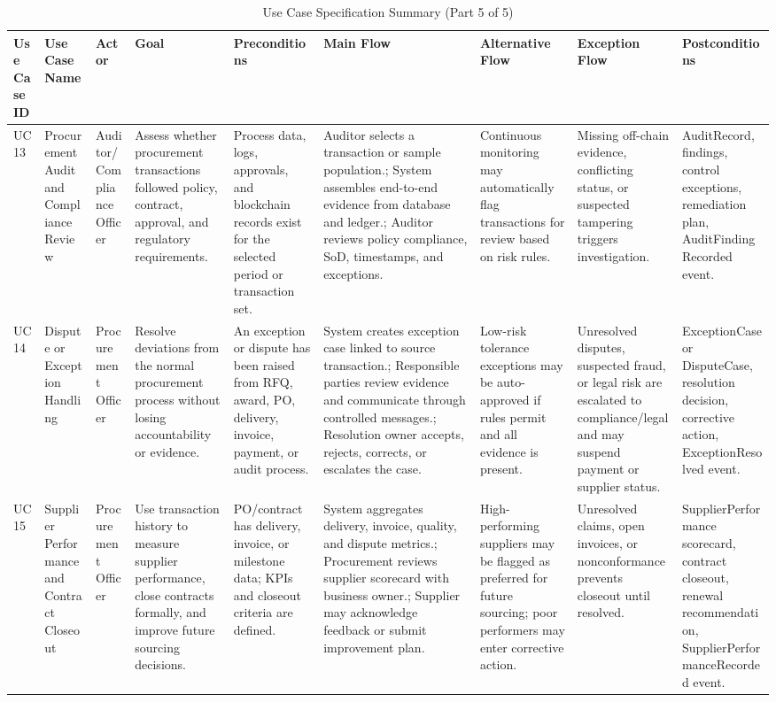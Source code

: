\documentclass[conference]{IEEEtran}
\begin{document}
\begin{table}[!t]
\caption{Use Case Specification Summary (Part 5 of 5)}
\label{tab:usecases-5}
\tiny
\begin{tabularx}{\textwidth}{|L{0.75cm}|L{1.8cm}|L{1.6cm}|Y|Y|Y|Y|Y|Y|}
\hline
\textbf{Use Case ID} & \textbf{Use Case Name} & \textbf{Actor} & \textbf{Goal} & \textbf{Preconditions} & \textbf{Main Flow} & \textbf{Alternative Flow} & \textbf{Exception Flow} & \textbf{Postconditions} \\ \hline
UC13 & Procurement Audit and Compliance Review & Auditor/Compliance Officer & Assess whether procurement transactions followed policy, contract, approval, and regulatory requirements. & Process data, logs, approvals, and blockchain records exist for the selected period or transaction set. & Auditor selects a transaction or sample population.; System assembles end-to-end evidence from database and ledger.; Auditor reviews policy compliance, SoD, timestamps, and exceptions. & Continuous monitoring may automatically flag transactions for review based on risk rules. & Missing off-chain evidence, conflicting status, or suspected tampering triggers investigation. & AuditRecord, findings, control exceptions, remediation plan, AuditFindingRecorded event. \\ \hline
UC14 & Dispute or Exception Handling & Procurement Officer & Resolve deviations from the normal procurement process without losing accountability or evidence. & An exception or dispute has been raised from RFQ, award, PO, delivery, invoice, payment, or audit process. & System creates exception case linked to source transaction.; Responsible parties review evidence and communicate through controlled messages.; Resolution owner accepts, rejects, corrects, or escalates the case. & Low-risk tolerance exceptions may be auto-approved if rules permit and all evidence is present. & Unresolved disputes, suspected fraud, or legal risk are escalated to compliance/legal and may suspend payment or supplier status. & ExceptionCase or DisputeCase, resolution decision, corrective action, ExceptionResolved event. \\ \hline
UC15 & Supplier Performance and Contract Closeout & Procurement Officer & Use transaction history to measure supplier performance, close contracts formally, and improve future sourcing decisions. & PO/contract has delivery, invoice, or milestone data; KPIs and closeout criteria are defined. & System aggregates delivery, invoice, quality, and dispute metrics.; Procurement reviews supplier scorecard with business owner.; Supplier may acknowledge feedback or submit improvement plan. & High-performing suppliers may be flagged as preferred for future sourcing; poor performers may enter corrective action. & Unresolved claims, open invoices, or nonconformance prevents closeout until resolved. & SupplierPerformance scorecard, contract closeout, renewal recommendation, SupplierPerformanceRecorded event. \\ \hline
\end{tabularx}
\end{table}
\end{document}
